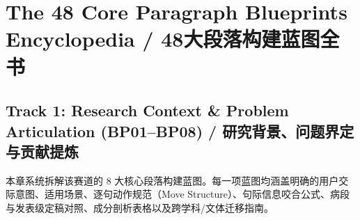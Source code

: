 \part{The 48 Core Paragraph Blueprints Encyclopedia / 48大段落构建蓝图全书}\label{part:blueprints}

\chapter{Track 1: Research Context \& Problem Articulation (BP01--BP08) / 研究背景、问题界定与贡献提炼}\label{ch:track_11}
本章系统拆解该赛道的 8 大核心段落构建蓝图。每一项蓝图均涵盖明确的用户交际意图、适用场景、逐句动作规范（Move Structure）、句际信息咬合公式、病段与发表级定稿对照、成分剖析表格以及跨学科/文体迁移指南。

